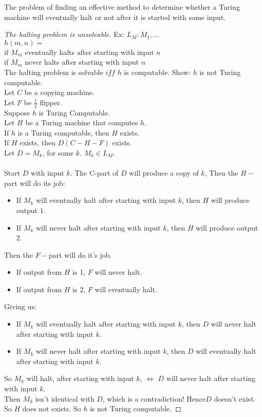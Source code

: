 \begin{definition}
The problem of finding an effective method to determine whether a Turing machine will eventually halt or not after it is started with some input.
\end{definition}
\begin{proof}[The halting problem is unsolvable]
Ex: $L_M: M_1,\dots$ \\
$h(m,n) =$ \\ %
 if $M_m$ eventually halts after starting with input $n$ \\
 if $M_m$ never halts after starting with input $n$ \\ 
The halting problem is solvable $iff$ $h$ is computable.
Show: $h$ is not Turing computable. \\
Let $C$ be a copying machine. \\
Let $F$ be $\frac{1}{2}$ flipper.\\
Suppose $h$ is Turing Computable.\\
Let $H$ be a Turing machine that computes $h$.\\
If $h$ is a Turing computable, then $H$ exists.\\
If $H$ exists, then $D(C-H-F)$ exists. \\
Let $D = M_k$, for some $k$. $M_k \in L_M$.\\
\\
Start $D$ with input $k$.
The C-part of $D$ will produce a copy of $k$,
Then the $H-$part will do its job:
\begin{itemize}
\item If $M_k$ will eventually halt after starting with input $k$, then $H$ will produce output $1$.
\item If $M_k$ will never halt after starting with input $k$, then $H$ will produce output $2$.
\end{itemize}
Then the $F-$part will do it's job.
\begin{itemize}
\item If output from $H$ is 1, $F$ will never halt.
\item If output from $H$ is 2, $F$ will eventually halt.
\end{itemize}
Giving us: \\
\begin{itemize}
\item If $M_k$ will eventually halt after starting with input $k$, then $D$ will never halt after starting with input $k$. \\
\item If $M_k$ will never halt after starting with input $k$, then $D$ will eventually halt after starting with input $k$. \\
\end{itemize}
So $M_k$ will halt, after starting with input $k$, $\iff$ $D$ will never halt after starting with input $k$.\\
Then $M_k$ isn't identical with $D$, which is a contradiction! Hence$D$ doesn't exist. So $H$ does not exists. So $h$ is not Turing computable.
\end{proof}


